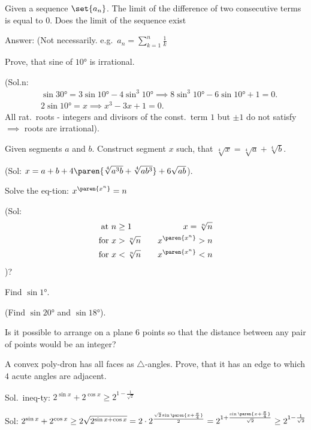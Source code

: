 \documentclass{article}
\begin{document}
\problem  %
Given a sequence $\set{a_n}$.
The limit of the difference of two consecutive terms is equal to $0$.
Does the limit of the sequence exist

Answer:
(Not necessarily. e.g.\ $a_n = \sum\limits_{k = 1}^n \frac{1}{k}$


\problem  %
Prove, that sine of $\ang{10}$ is irrational.

(Sol.n:
\begin{align*}
  &\sin\ang{30} = 3 \sin\ang{10} - 4 \sin^3\ang{10}
   \implies
   8 \sin^3\ang{10} - 6 \sin\ang{10} + 1 = 0. \\
  &2 \sin\ang{10} = x
   \implies
   x^3 - 3x + 1 = 0.
\end{align*}
All rat.\ roots - integers and divisors of the const.\ term $1$ but $\pm 1$ do not satisfy
$\implies$ roots are irrational).


\problem  %
Given segments $a$ and $b$.
Construct segment $x$ such, that $\sqrt[4]{x} = \sqrt[4]{a} + \sqrt[4]{b}$.

(Sol: $x = a + b + 4 \paren{\sqrt[4]{a^3 b} + \sqrt[4]{a b^3}} + 6\sqrt{a b}$).


\problem  %
Solve the eq-tion: $x^{\paren{x^n}} = n$

(Sol:
\begin{alignat*}{2}
  \text{at }  n &\geq 1         \quad  &x = \sqrt[n]{n}      \\
  \text{for } x &> \sqrt[n]{n}  \quad  &x^{\paren{x^n}} > n  \\
  \text{for } x &< \sqrt[n]{n}  \quad  &x^{\paren{x^n}} < n
\end{alignat*}%
)?


\problem  %
Find $\sin\ang{1}$.

(Find $\sin\ang{20}$ and $\sin\ang{18}$).


\problem  %
Is it possible to arrange on a plane $6$ points so that the distance between any pair of points would be an integer?


\problem  %
A convex poly-dron has all faces as $\triangle$-angles.
Prove, that it has an edge to which $4$ acute angles are adjacent.


\problem  %
Sol.\ ineq-ty: $2^{\sin x} + 2^{\cos x} \ge 2^{1 - \frac{1}{\sqrt{2}}}$

Sol:
$2^{\sin{x}} + 2^{\cos{x}}
 \geq 2 \sqrt{2^{\sin{x} + \cos{x}}}
 = 2 \cdot 2^{\frac{\sqrt{2} \sin\paren{x + \frac{\pi}{4}}}{2}}
 = 2^{1 + \frac{\sin\paren{x + \frac{\pi}{4}}}{\sqrt{2}}}
 \geq 2^{1 - \frac{1}{\sqrt{2}}}$
\end{document}

